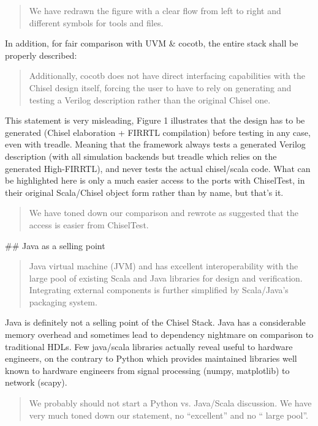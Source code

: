 \documentclass{article}
\newcommand{\reply}[1]{{\color{blue} #1}}
\begin{document}
\begin{quote}
\reply{We have redrawn the figure with a clear flow from left to right and different symbols for tools and files.}
\end{quote}


In addition, for fair comparison with UVM \& cocotb, the entire stack shall be properly described:

\begin{quote}
Additionally, cocotb does not have direct interfacing
capabilities with the Chisel design itself, forcing the user to
have to rely on generating and testing a Verilog description
rather than the original Chisel one.
\end{quote}

This statement is very misleading, Figure 1 illustrates that the design has to be generated (Chisel elaboration + FIRRTL compilation) before testing in any case, even with treadle.
Meaning that the framework always tests a generated Verilog description (with all simulation backends but treadle which relies on the generated High-FIRRTL), and never tests the actual chisel/scala code.
What can be highlighted here is only a much easier access to the ports with ChiselTest, in their original Scala/Chisel object form rather than by name, but that's it.

\begin{quote}
\reply{We have toned down our comparison and rewrote as suggested that the access is easier from ChiselTest.}
\end{quote}


\#\# Java as a selling point
\begin{quote}
Java virtual machine (JVM) and has excellent interoperability with
the large pool of existing Scala and Java libraries for design
and verification. Integrating external components is further
simplified by Scala/Java's packaging system.
\end{quote}

Java is definitely not a selling point of the Chisel Stack.
Java has a considerable memory overhead and sometimes lead to dependency nightmare on comparison to traditional HDLs.
Few java/scala libraries actually reveal useful to hardware engineers, on the contrary to Python which provides maintained libraries well known to hardware engineers from signal processing (numpy, matplotlib) to network (scapy).

\begin{quote}
\reply{We probably should not start a Python vs. Java/Scala discussion. We have very much toned down our statement, no ``excellent''
and no `` large pool''.}
\end{quote}
\end{document}
